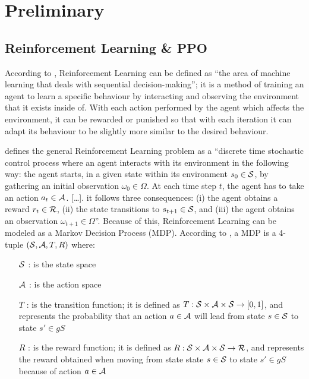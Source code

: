 \chapter{Preliminary}


\section{Reinforcement Learning \& PPO}

According to \cite{Fran_ois_Lavet_2018_rlintro}, Reinforcement Learning can be defined as \enquote{the area of machine learning that deals with sequential decision-making}; it is a method of training an agent to learn a specific behaviour by interacting and observing the environment that it exists inside of. With each action performed by the agent which affects the environment, it can be rewarded or punished so that with each iteration it can adapt its behaviour to be slightly more similar to the desired behaviour. 

\cite{Fran_ois_Lavet_2018_rlintro} defines the general Reinforcement Learning problem as a \enquote{discrete time stochastic control process where an agent interacts with its environment in the following way: the agent starts, in a given state within its environment $s_0 \in {\mathcal{S}}$, by gathering an initial observation $\omega_0 \in \Omega$. At each time step $t$, the agent has to take an action $a_t \in {\mathcal{A}}$. [\dots]. it follows three consequences: (i) the agent obtains a reward $r_t \in {\mathcal{R}}$, (ii) the state transitions to $s_{t+1} \in {\mathcal{S}}$, and (iii) the agent obtains an observation $\omega_{t+1} \in \Omega$}. Because of this, Reinforcement Learning can be modeled as a Markov Decision Process (MDP). According to \cite{Bellman_MDP}, a MDP is a 4-tuple $({\mathcal{S}}, {\mathcal{A}}, T, R)$ where:
\begin{itemize}
    \item [${\mathcal{S}}$]: is the state space
    \item [${\mathcal{A}}$]: is the action space
    \item [$T$]: is the transition function; it is defined as $T: {\mathcal{S}} \times {\mathcal{A}} \times {\mathcal{S}} \rightarrow [0, 1]$, and represents the probability that an action $a \in {\mathcal{A}}$ will lead from state $s \in {\mathcal{S}}$ to state $s' \in gS$
    \item [$R$]: is the reward function; it is defined as $R: {\mathcal{S}} \times {\mathcal{A}} \times {\mathcal{S}} \rightarrow {\mathcal{R}}$, and represents the reward obtained when moving from state state $s \in {\mathcal{S}}$ to state $s' \in gS$ because of action $a \in {\mathcal{A}}$
\end{itemize}

